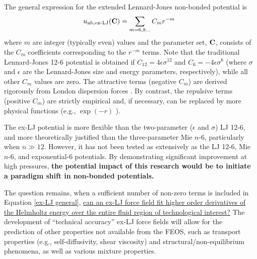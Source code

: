 \documentclass[12pt,a4paper]{article}
\newcommand{\bfm}[1]{{\bf #1}}
\newcommand{\C}{\bfm{C}}
\begin{document}
The general expression for the extended Lennard-Jones non-bonded potential is
\begin{equation} \label{ex-LJ general}
u_{\rm nb, ex\text{-}LJ}(\C) = \sum_{m = 6, 8 ...} C_m r^{-m} 
\end{equation} 
where $m$ are integer (typically even) values and the parameter set, $\C$, consists of the $C_m$ coefficients corresponding to the $r^{-m}$ terms. Note that the traditional Lennard-Jones 12-6 potential is obtained if $C_{12} = 4\epsilon\sigma^{12}$ and $C_6=-4\epsilon\sigma^{6}$ (where $\sigma$ and $\epsilon$ are the Lennard-Jones size and energy parameters, respectively), while all other $C_m$ values are zero. The attractive terms (negative $C_m$) are derived rigorously from London dispersion forces \cite{Stone2013}. By contrast, the repulsive terms (positive $C_m$) are strictly empirical and, if necessary, can be replaced by more physical functions (e.g., $\exp(-r)$ \cite{Hellmann2017,Przybytek2017}). 



The ex-LJ potential is more flexible than the two-parameter ($\epsilon$ and $\sigma$) LJ 12-6, and more theoretically justified than the three-parameter Mie $n$-6, particularly when $n \gg 12$. However, it has not been tested as extensively as the LJ 12-6, Mie $n$-6, and exponential-6 potentials. By demonstrating significant improvement at high pressures, \textbf{the potential impact of this research would be to initiate a paradigm shift in non-bonded potentials.}

The question remains, when a sufficient number of non-zero terms is included in Equation \ref{ex-LJ general}, \ul{can an ex-LJ force field fit higher order derivatives of the Helmholtz energy over the entire fluid region of technological interest?} The development of ``technical accuracy'' ex-LJ force fields will allow for the prediction of other properties not available from the FEOS, such as transport properties (e.g., self-diffusivity, shear viscosity) and structural/non-equilibrium phenomena, as well as various mixture properties.

\end{document}
